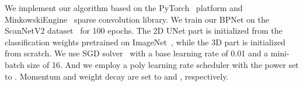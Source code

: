 \documentclass[final]{cvpr}
\begin{document}
We implement our algorithm based on the PyTorch~\cite{paszke2019pytorch} platform and MinkowskiEngine~\cite{choy20194d}
sparse convolution library.
We train our BPNet on the ScanNetV2 dataset~\cite{dai2017scannet} for 100 epochs.
The 2D UNet part is initialized from the classification weights pretrained on ImageNet~\cite{deng2009imagenet}, while the 3D part is initialized from scratch.
We use SGD solver~\cite{bottou2010large} with a base learning rate of 0.01 and a mini-batch size of 16. And we employ a poly learning rate scheduler with the power set to . Momentum and weight decay are set to  and , respectively.
\end{document}
